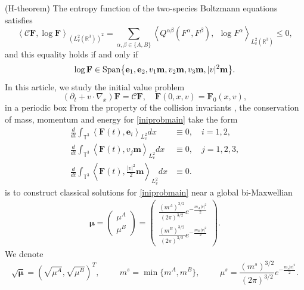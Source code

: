 \documentclass[reqno]{amsart}
\numberwithin{equation}{section}
\numberwithin{equation}{section}
\begin{document}
 \noindent (H-theorem) 
	The entropy function of the two-species Boltzmann equations  satisfies
	\begin{equation}\label{equation1.5}
		\left \langle
		\mathscr{C}\mathbf{F},  \log \mathbf{F}
		\right \rangle_{(L_v^2(\mathbb{R}^3))^2}
		= \sum_{\alpha,\beta\in \{A,B\}}\left\langle Q^{\alpha  \beta}(F^{\alpha},F^{\beta}) , ~~\log F^{\alpha} \right\rangle_{L_v^2(\mathbb{R}^3)}   \leq 0,
	\end{equation}
	and this equality holds if and only if 
	\begin{equation}\label{basisHG}
		\log \mathbf{F} \in {\rm Span} \big\{\mathbf{e}_1, \mathbf{e}_2, v_1 \mathbf{m}, v_2 \mathbf{m}, v_3 \mathbf{m}, |v|^2 \mathbf{m}\big\}.
	\end{equation}
In this article, we study the initial value problem
\begin{equation}\label{iniprobmain}
(\partial_t + v \cdot \nabla_{x}) \mathbf{F} = \mathscr{C} \mathbf{F} , \quad \mathbf{F}(0, x, v) = \mathbf{F}_0(x, v),
\end{equation}
in a periodic box From the property of the collision invariants , the conservation of mass, momentum and energy for \eqref{iniprobmain} take the form
\begin{align*}
	\frac{d}{dt} \int_{\mathbb{T}^3} \left\langle \mathbf{F}(t), \mathbf{e}_i \right\rangle_{L_v^2}  dx  &\equiv 0, \quad i=1,2,\\
	\frac{d}{dt} \int_{\mathbb{T}^3} \left\langle \mathbf{F}(t), v_j \mathbf{m} \right\rangle_{L_v^2} dx &\equiv 0, \quad j=1,2,3,\\
		\frac{d}{dt} \int_{\mathbb{T}^3} \left\langle \mathbf{F}(t), \frac{|v|^2}{2}\mathbf{m}   \right\rangle_{L_v^2}dx &\equiv 0.
\end{align*}
is to construct classical solutions for \eqref{iniprobmain} near a global bi-Maxwellian
	\begin{gather}\label{GBM}
	\bm{\mu}=
	\left(
	\begin{array}{cccc}
		\mu^A\\
		\mu^B
	\end{array}
	\right)
	=
	\left(
	\begin{array}{cccc}
		\frac{({m^A})^{3/2}}{(2\pi )^{3/2}}	e^{- \frac{m_A|v|^2}{2}}\\
		\frac{({m^B})^{3/2}}{(2\pi )^{3/2}}	e^{- \frac{m_B|v|^2}{2}}
	\end{array}
	\right).
\end{gather}
We denote 
\begin{equation}\label{defmsmsmsmsms}
\sqrt{\bm{\mu}}=(\sqrt{\mu^A},\sqrt{\mu^B})^T,\hspace{1cm}m^s=\min\big\{m^A,m^B\big\}, \hspace{1cm}  \mu^{s}=\frac{({m^s})^{3/2}}{(2\pi )^{3/2}}	e^{- \frac{m_s|v|^2}{2}}.
\end{equation}
\end{document}
